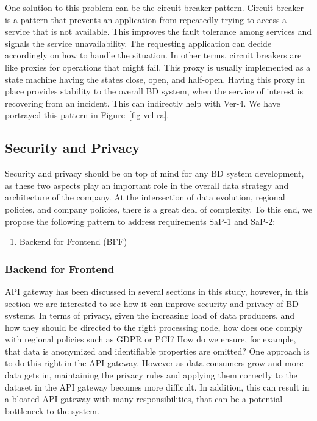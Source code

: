 \documentclass{bmcart}
\begin{document}
One solution to this problem can be the circuit breaker pattern. Circuit breaker is a pattern that prevents an application from repeatedly trying to access a service that is not available. This improves the fault tolerance among services and signals the service unavailability. The requesting application can decide accordingly on how to handle the situation. In other terms, circuit breakers are like proxies for operations that might fail. This proxy is usually implemented as a state machine having the states close, open, and half-open. Having this proxy in place provides stability to the overall BD system, when the service of interest is recovering from an incident. This can indirectly help with Ver-4. We have portrayed this pattern in Figure~\ref{fig-vel-ra}.




\subsection{Security and Privacy}

Security and privacy should be on top of mind for any BD system development, as these two aspects play an important role in the overall data strategy and architecture of the company. At the intersection of data evolution, regional policies, and company policies, there is a great deal of complexity. To this end, we propose the following pattern to address requirements SaP-1 and SaP-2:

\begin{enumerate}
  \item Backend for Frontend (BFF)
\end{enumerate}

\subsubsection{Backend for Frontend}

API gateway has been discussed in several sections in this study, however, in this section we are interested to see how it can improve security and privacy of BD systems. In terms of privacy, given the increasing load of data producers, and how they should be directed to the right processing node, how does one comply with regional policies such as GDPR or PCI? How do we ensure, for example, that data is anonymized and identifiable properties are omitted? One approach is to do this right in the API gateway. However as data consumers grow and more data gets in, maintaining the privacy rules and applying them correctly to the dataset in the API gateway becomes more difficult. In addition, this can result in a bloated API gateway with many responsibilities, that can be a potential bottleneck to the system.
\end{document}
